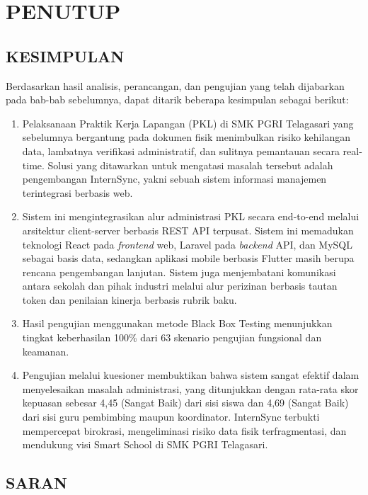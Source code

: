\chapter{PENUTUP}

\section{KESIMPULAN}

Berdasarkan hasil analisis, perancangan, dan pengujian yang telah dijabarkan pada bab-bab sebelumnya, dapat ditarik beberapa kesimpulan sebagai berikut:

\begin{enumerate}[label=\arabic*.]
\item Pelaksanaan Praktik Kerja Lapangan (PKL) di SMK PGRI Telagasari yang sebelumnya bergantung pada dokumen fisik menimbulkan risiko kehilangan data, lambatnya verifikasi administratif, dan sulitnya pemantauan secara real-time. Solusi yang ditawarkan untuk mengatasi masalah tersebut adalah pengembangan InternSync, yakni sebuah sistem informasi manajemen terintegrasi berbasis web.
\item Sistem ini mengintegrasikan alur administrasi PKL secara end-to-end melalui arsitektur client-server berbasis REST API terpusat. Sistem ini memadukan teknologi React pada \textit{frontend} web, Laravel pada \textit{backend} API, dan MySQL sebagai basis data, sedangkan aplikasi mobile berbasis Flutter masih berupa rencana pengembangan lanjutan. Sistem juga menjembatani komunikasi antara sekolah dan pihak industri melalui alur perizinan berbasis tautan token dan penilaian kinerja berbasis rubrik baku.
\item Hasil pengujian menggunakan metode Black Box Testing menunjukkan tingkat keberhasilan 100\% dari 63 skenario pengujian fungsional dan keamanan.
\item Pengujian melalui kuesioner membuktikan bahwa sistem sangat efektif dalam menyelesaikan masalah administrasi, yang ditunjukkan dengan rata-rata skor kepuasan sebesar 4,45 (Sangat Baik) dari sisi siswa dan 4,69 (Sangat Baik) dari sisi guru pembimbing maupun koordinator. InternSync terbukti mempercepat birokrasi, mengeliminasi risiko data fisik terfragmentasi, dan mendukung visi Smart School di SMK PGRI Telagasari.
\end{enumerate}

\section{SARAN}

